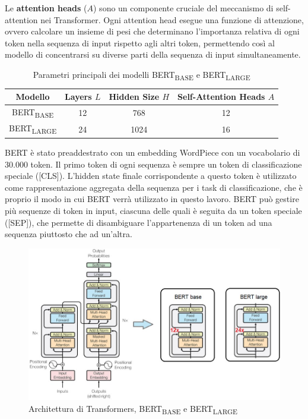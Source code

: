 \documentclass[../../Thesis.tex]{subfiles}
\begin{document}
Le \textbf{attention heads} ($A$) sono un componente cruciale del meccanismo di self-attention nei Transformer. Ogni attention head esegue una funzione di attenzione, ovvero calcolare un insieme di pesi che determinano l'importanza relativa di ogni token nella sequenza di input rispetto agli altri token, permettendo così al modello di concentrarsi su diverse parti della sequenza di input simultaneamente. 

\begin{table}[h]
    \centering
    \begin{tabular}{|c|c|c|c|}
        \hline
        Modello & Layers $L$ & Hidden Size $H$ & Self-Attention Heads $A$ \\
        \hline
        BERT\textsubscript{BASE} & 12 & 768 & 12 \\
        \hline
        BERT\textsubscript{LARGE} & 24 & 1024 & 16 \\
        \hline
    \end{tabular}
    \caption{Parametri principali dei modelli BERT\textsubscript{BASE} e BERT\textsubscript{LARGE}}
    \label{tab:bert_params}
\end{table}
\label{sec:bert}
BERT è stato preaddestrato con un embedding WordPiece \cite{WordPiece} con un vocabolario di 30.000 token. Il primo token di ogni sequenza è sempre un token di classificazione speciale ([CLS]). L'hidden state finale corrispondente a questo token è utilizzato come rappresentazione aggregata della sequenza per i task di classificazione, che è proprio il modo in cui BERT verrà utilizzato in questo lavoro. BERT può gestire più sequenze di token in input, ciascuna delle quali è seguita da un token speciale ([SEP]), che permette di disambiguare l'appartenenza di un token ad una sequenza piuttosto che ad un'altra. 

\begin{figure}[H]
    \centering
    \includegraphics[width=\textwidth]{../../img/bert_base_large.jpg}
    \caption{Architettura di Transformers, BERT\textsubscript{BASE} e BERT\textsubscript{LARGE}}
    \label{fig:bert_input}
\end{figure}
\end{document}
